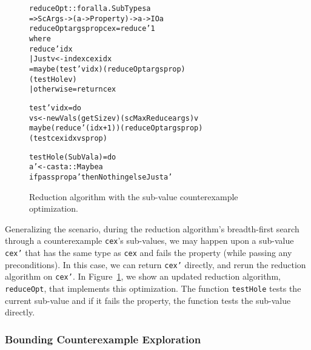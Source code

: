 \documentclass{sigplanconf}
\newenvironment{code}{\begin{alltt}\footnotesize}{\end{alltt}}
\newcommand{\ttp}[1]{\texttt{#1}}
\begin{document}

\begin{figure}
\begin{code}
reduceOpt :: forall a . SubTypes a
  => ScArgs -> (a -> Property) -> a -> IO a
reduceOpt args prop cex = reduce' 1
  where
  reduce' idx
    | Just v <- index cex idx
    = maybe (test' v idx) (reduceOpt args prop)
            (testHole v)
    | otherwise = return cex

  test' v idx = do
    vs <- newVals (getSize v) (scMaxReduce args) v
    maybe (reduce' (idx+1)) (reduceOpt args prop)
          (test cex idx vs prop)

  testHole (SubVal a) = do
    a' <- cast a :: Maybe a
    if pass prop a' then Nothing else Just a'
\end{code}
  \caption{Reduction algorithm with the sub-value counterexample optimization.}
  \label{fig:reduce0}
\end{figure}

Generalizing the scenario, during the reduction algorithm's breadth-first
search through a counterexample \ttp{cex}'s sub-values, we may happen upon a
sub-value \ttp{cex'} that has the same type as \ttp{cex} and fails the property
(while passing any preconditions).  In this case, we can return \ttp{cex'}
directly, and rerun the reduction algorithm on \ttp{cex'}.  In
Figure~\ref{fig:reduce0}, we show an updated reduction algorithm, \ttp{reduceOpt},
that implements this optimization.  The function \ttp{testHole} tests the
current sub-value and if it fails the property, the function tests the sub-value
directly.


\subsubsection{Bounding Counterexample Exploration}
\end{document}
